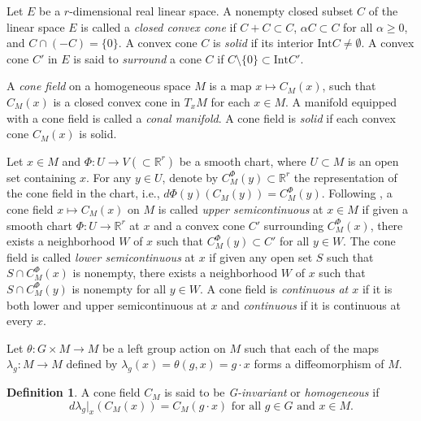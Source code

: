 \documentclass[a4paper,11pt]{article}
\theoremstyle{plain}
\theoremstyle{definition}
\newtheorem{defn}[thm]{Definition}
\numberwithin{equation}{section}
\begin{document}
Let $E$ be a $r$-dimensional real linear space. A nonempty closed subset $C$ of the linear space $E$ is called a \textit{closed convex cone} if $C+C\subset C$, $\alpha C\subset C$ for all $\alpha \geq 0$, and $C \cap (-C) = \{0\}$. A convex cone $C$ is \textit{solid} if its interior $\text{Int} C \neq \emptyset$. A convex cone $C'$ in $E$ is said to \textit{surround} a cone $C$ if $C\setminus \{ 0\}\subset \text{Int}C'$.


A \textit{cone field} on a homogeneous space $M$ is a map $x \mapsto C_{M}(x)$, such that $C_{M}(x)$ is a closed convex cone in $T_{x}M$ for each $x\in M$.
A manifold equipped with a cone field is called a \textit{conal manifold}. A cone field is \textit{solid} if each convex cone $C_{M}(x)$ is solid.



Let $x\in M$ and $\Phi \colon U \to V(\subset \mathbb{R}^r)$ be a smooth chart, where $U\subset M$ is an open set containing $x$. For any $y\in U$, denote by $C_{M}^{\Phi}(y)\subset \mathbb{R}^r$ the representation of the cone field in the chart, i.e., $d\Phi(y)(C_{M}(y))= C_{M}^{\Phi}(y)$. Following \cite{Lawson89},
a cone field $x \mapsto C_{M}(x)$ on $M$ is called \textit{upper semicontinuous} at $x\in M$ if given a smooth chart $\Phi \colon U \to \mathbb{R}^{r}$ at $x$ and a convex cone $C'$ surrounding $C_{M}^{\Phi}(x)$, there exists a neighborhood $W$ of $x$ such that $C_{M}^{\Phi}(y)\subset C'$ for all $y\in W$. The cone field is called \textit{lower semicontinuous} at $x$ if given any open set $S$ such that $S\cap C_{M}^{\Phi}(x)$ is nonempty, there exists a neighborhood $W$ of $x$ such that $S\cap C_{M}^{\Phi}(y)$ is nonempty for all $y\in W$. A cone field is \textit{continuous at $x$} if it is both lower and upper semicontinuous at $x$ and \textit{continuous} if it is continuous at every $x$.






Let $\theta : G\times M \to M$ be a left group action on $M$ such that each of the maps $\lambda_g \colon M\to M$ defined by $\lambda_g(x)=\theta(g,x)=g\cdot x$ forms a diffeomorphism of $M$. 


\begin{defn}
A cone field $C_M$ is said to be \textit{G-invariant} or \textit{homogeneous} if $$d\lambda_g \vert_x (C_M(x))=C_M(g\cdot x) \text{~for all~} g\in G \text{~and~} x\in M.$$
\end{defn}
\end{document}
